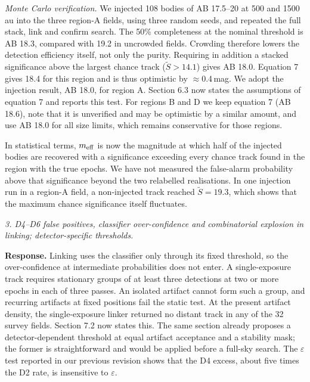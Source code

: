 \documentclass[11pt]{article}
\newenvironment{referee}{\par\color{black!60}\itshape}{\par}
\newcommand{\resp}{\par\noindent\textbf{Response.} }
\begin{document}
\emph{Monte Carlo verification.} We injected 108 bodies of AB 17.5--20 at 500 and 1500\,au into the three region-A fields, using three random seeds, and repeated the full stack, link and confirm search. The 50\% completeness at the nominal threshold is AB 18.3, compared with 19.2 in uncrowded fields. Crowding therefore lowers the detection efficiency itself, not only the purity. Requiring in addition a stacked significance above the largest chance track ($\widetilde{S} > 14.1$) gives AB 18.0. Equation 7 gives 18.4 for this region and is thus optimistic by $\approx$0.4\,mag. We adopt the injection result, AB 18.0, for region A. Section 6.3 now states the assumptions of equation 7 and reports this test. For regions B and D we keep equation 7 (AB 18.6), note that it is unverified and may be optimistic by a similar amount, and use AB 18.0 for all size limits, which remains conservative for those regions.

In statistical terms, $m_{\rm eff}$ is now the magnitude at which half of the injected bodies are recovered with a significance exceeding every chance track found in the region with the true epochs. We have not measured the false-alarm probability above that significance beyond the two relabelled realisations. In one injection run in a region-A field, a non-injected track reached $\widetilde{S} = 19.3$, which shows that the maximum chance significance itself fluctuates.

\begin{referee}
3. D4--D6 false positives, classifier over-confidence and combinatorial explosion in linking; detector-specific thresholds.
\end{referee}
\resp Linking uses the classifier only through its fixed threshold, so the over-confidence at intermediate probabilities does not enter. A single-exposure track requires stationary groups of at least three detections at two or more epochs in each of three passes. An isolated artifact cannot form such a group, and recurring artifacts at fixed positions fail the static test. At the present artifact density, the single-exposure linker returned no distant track in any of the 32 survey fields. Section 7.2 now states this. The same section already proposes a detector-dependent threshold at equal artifact acceptance and a stability mask; the former is straightforward and would be applied before a full-sky search. The $\varepsilon$ test reported in our previous revision shows that the D4 excess, about five times the D2 rate, is insensitive to $\varepsilon$.
\end{document}
